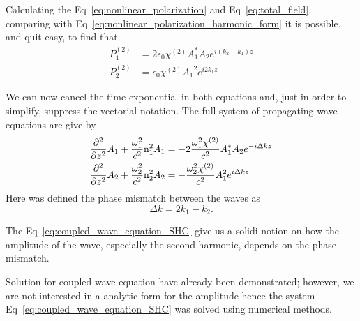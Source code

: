Calculating the Eq~\ref{eq:nonlinear_polarization} and Eq~\ref{eq:total_field}, comparing with Eq~\ref{eq:nonlinear_polarization_harmonic_form} it is possible, and quit easy, to find that
\begin{subequations}
    \begin{align}
        P^{(2)}_1 &= 2\epsilon_0\chi^{(2)} A^*_1 A_2e^{i(k_2-k_1)z}\\
        P^{(2)}_2 &= \epsilon_0\chi^{(2)} {A_1}^2e^{i2k_1z}
    \end{align}
\end{subequations}


We can now cancel the time exponential in both equations and, just in order to simplify, suppress the vectorial notation. The full system of propagating wave equations are give by 
\begin{subequations}
    \begin{align}
       \frac{\partial^2}{\partial z^2}A_1 +\frac{\omega_1^2}{c^2}\text{n}_1^2 A_1 &= -2\frac{\omega_1^2 \chi^{(2)}}{c^2} A^*_1 A_2e^{-i\Delta kz}\\
       \frac{\partial^2}{\partial z^2}A_2 +\frac{\omega_2^2}{c^2}\text{n}_2^2 A_2 &= -\frac{\omega_2^2\chi^{(2)}}{c^2} A_1^2e^{i\Delta k z}
    \end{align}
    \label{eq:coupled_wave_equation_SHC}
\end{subequations}
Here was defined the phase mismatch between the waves as
\begin{equation}
    \Delta k = 2k_1 - k_2.
\end{equation}

The Eq~\ref{eq:coupled_wave_equation_SHC} give us a solidi notion on how the amplitude of the wave, especially the second harmonic, depends on the phase mismatch. 

Solution for coupled-wave equation have already been demonstrated; however, we are not interested in a analytic form for the amplitude hence the system Eq~\ref{eq:coupled_wave_equation_SHC} was solved using numerical methods.

